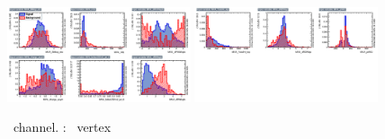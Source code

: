 \begin{figure}[htbp]
	\includegraphics[width=0.48\textwidth]{6_Search/Figures/MVAtechnics/singletopzut/uue/variables_id_c1.png}
	\includegraphics[width=0.48\textwidth]{6_Search/Figures/MVAtechnics/singletopzut/uue/variables_id_c2.png}
	\caption{\emumu\ channel. \STSR: \Zut\ vertex }
	\label{image:Figuresuuesingletopzut}
\end{figure}


